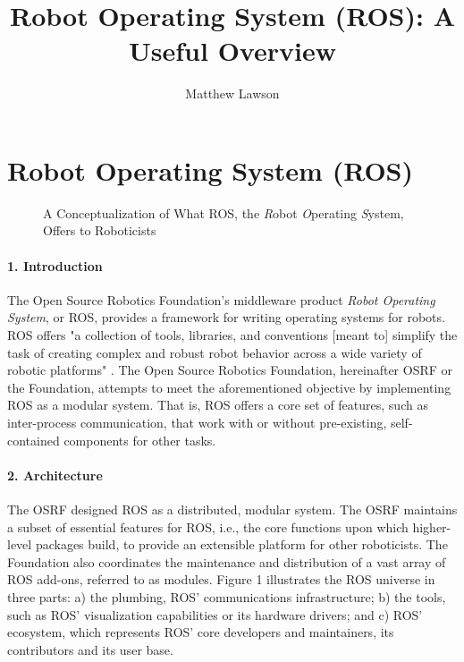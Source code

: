 \documentclass[9pt,twocolumn,twoside]{../../styles/osajnl}
\title{Robot Operating System (ROS): A Useful Overview}
\author[1]{Matthew Lawson}
\affil[1]{School of Informatics and Computing, Bloomington, IN 47408, U.S.A.}
\affil[*]{Corresponding authors: laszewski@gmail.com}
\begin{document}
\maketitle

\section{Robot Operating System (ROS)}

\begin{figure}[htbp]
\centering
{}
\caption{A Conceptualization of What ROS, the \textit{R}obot \textit{O}perating \textit{S}ystem, Offers to Roboticists \cite{www-ros-ros-is}}
\label{fig:rosOverview}
\end{figure}

\paragraph{1. Introduction}

The Open Source Robotics Foundation's middleware product \textit{Robot Operating System}, or ROS, provides a framework for writing operating systems for robots.  ROS offers "a collection of tools, libraries, and conventions [meant to] simplify the task of creating complex and robust robot behavior across a wide variety of robotic platforms" \cite{www-ros-about}. The Open Source Robotics Foundation, hereinafter OSRF or the Foundation, attempts to meet the aforementioned objective by implementing ROS as a modular system.  That is, ROS offers a core set of features, such as inter-process communication, that work with or without pre-existing, self-contained components for other tasks.

\paragraph{2. Architecture} 

The OSRF designed ROS as a distributed, modular system.  The OSRF maintains a subset of essential features for ROS, i.e., the core functions upon which higher-level packages build, to provide an extensible platform for other roboticists.  The Foundation also coordinates the maintenance and distribution of a vast array of ROS add-ons, referred to as modules.  Figure 1 illustrates the ROS universe in three parts: a) the plumbing, ROS' communications infrastructure; b) the tools, such as ROS' visualization capabilities or its hardware drivers; and c) ROS' ecosystem, which represents ROS' core developers and maintainers, its contributors and its user base.
\end{document}
